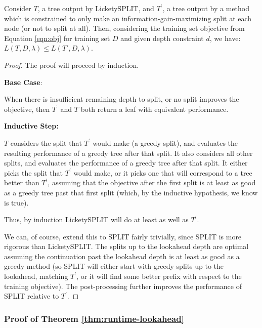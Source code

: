 \begin{theorem}
\label{thm:relwork}
    Consider $T$, a tree output by LicketySPLIT, and $T^{\prime}$, a tree output by a method which is constrained to only make an information-gain-maximizing split at each node (or not to split at all). Then, considering the training set objective from Equation \ref{eqn:obj} for training set $D$ and given depth constraint $d$, we have:  $L(T, D, \lambda) \leq L(T', D, \lambda)$.
\end{theorem}
\begin{proof}
    The proof will proceed by induction.

\textbf{Base Case}:

When there is insufficient remaining depth to split, or no split improves the objective, then $T^\prime$ and $T$ both return a leaf with equivalent performance.

\textbf{Inductive Step:}

$T$ considers the split that $T^\prime$ would make (a greedy split), and evaluates the resulting performance of a greedy tree after that split. It also considers all other splits, and evaluates the performance of a greedy tree after that split. It either picks the split that $T^\prime$ would make, or it picks one that will correspond to a tree better than $T^\prime$, assuming that the objective after the first split is at least as good as a greedy tree past that first split (which, by the inductive hypothesis, we know is true).

Thus, by induction LicketySPLIT will do at least as well as $T^\prime$.

We can, of course, extend this to SPLIT fairly trivially, since SPLIT is more rigorous than LicketySPLIT. The splits up to the lookahead depth are optimal assuming the continuation past the lookahead depth is at least as good as a greedy method (so SPLIT will either start with greedy splits up to the lookahead, matching $T^\prime$, or it will find some better prefix with respect to the training objective). The post-processing further improves the performance of SPLIT relative to $T^\prime$.
\end{proof}

\subsubsection{Proof of Theorem \ref{thm:runtime-lookahead}}

